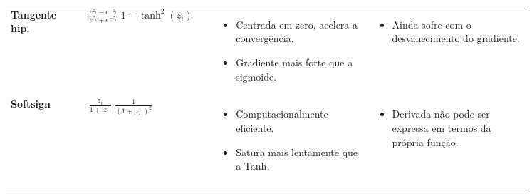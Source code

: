 \begin{longtable}{@{} l p{0.25\linewidth} p{0.3\linewidth} p{0.3\linewidth} @{}}
    \textbf{Tangente hip.} & 
    $\displaystyle \frac{e^{z_i} - e^{-z_i}}{e^{z_i} + e^{-z_i}}$ \newline\vspace{0.2cm}
    $\displaystyle 1 - \tanh^2(z_i)$
    &
    \begin{itemize}[noitemsep, topsep=0pt, partopsep=0pt, leftmargin=*]
        \item Centrada em zero, acelera a convergência.
        \item Gradiente mais forte que a sigmoide.
    \end{itemize}
    &
    \begin{itemize}[noitemsep, topsep=0pt, partopsep=0pt, leftmargin=*]
        \item Ainda sofre com o desvanecimento do gradiente.
    \end{itemize}
    \\ \addlinespace
    
    \textbf{Softsign} &
    $\displaystyle \frac{z_i}{1 + |z_i|}$ \newline\vspace{0.2cm}
    $\displaystyle \frac{1}{(1 + |z_i|)^2}$
    &
    \begin{itemize}[noitemsep, topsep=0pt, partopsep=0pt, leftmargin=*]
        \item Computacionalmente eficiente.
        \item Satura mais lentamente que a Tanh.
    \end{itemize}
    &
    \begin{itemize}[noitemsep, topsep=0pt, partopsep=0pt, leftmargin=*]
        \item Derivada não pode ser expressa em termos da própria função.
    \end{itemize}
    \\ \addlinespace


\end{longtable}
